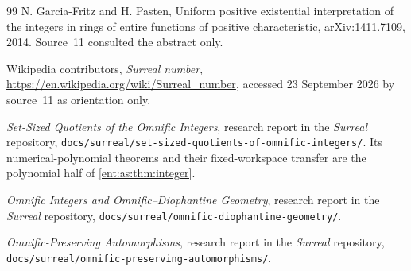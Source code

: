 \documentclass[11pt]{article}
\theoremstyle{plain}
\theoremstyle{plain}
\theoremstyle{plain}
\theoremstyle{definition}
\theoremstyle{definition}
\theoremstyle{definition}
\theoremstyle{definition}
\theoremstyle{remark}
\begin{document}
\begin{thebibliography}{99}
N. Garcia-Fritz and H. Pasten, Uniform positive existential interpretation of
the integers in rings of entire functions of positive characteristic,
arXiv:1411.7109, 2014. Source~11 consulted the abstract only.

Wikipedia contributors, \emph{Surreal number},
\url{https://en.wikipedia.org/wiki/Surreal_number}, accessed 23 September 2026
by source~11 as orientation only.

\emph{Set-Sized Quotients of the Omnific Integers}, research report in the
\emph{Surreal} repository,
\texttt{docs/surreal/set-sized-quotients-of-omnific-integers/}. Its
numerical-polynomial theorems and their fixed-workspace transfer are the
polynomial half of \cref{ent:as:thm:integer}.

\emph{Omnific Integers and Omnific--Diophantine Geometry}, research report in
the \emph{Surreal} repository,
\texttt{docs/surreal/omnific-diophantine-geometry/}.

\emph{Omnific-Preserving Automorphisms}, research report in the
\emph{Surreal} repository,
\texttt{docs/surreal/omnific-preserving-automorphisms/}.
\end{thebibliography}
\endgroup
\end{document}
